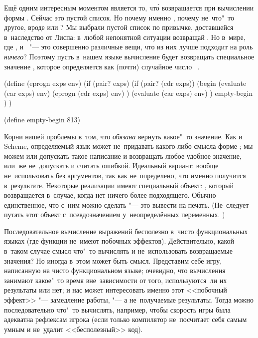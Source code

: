 Ещё одним интересным моментом является то, чт\'{о} возвращается при вычислении
формы . Сейчас это пустой список. Но почему именно \ic{()}, почему
не~что"~то другое, вроде  или \ic{(\nya)}? Мы выбрали пустой список по
привычке, доставшейся в~наследство от Лиспа: в~любой непонятной ситуации
возвращай . Но в~мире, где ,  и~\ic{()} "--- это
совершенно различные вещи, что из них лучше подходит на роль \emph{ничего}?
Поэтому пусть в~нашем языке вычисление  будет возвращать специальное
значение , которое определяется как (почти) случайное число
~\cite{leb05}.

\begin{code:lisp}
(define (eprogn exps env)
  (if (pair? exps)
      (if (pair? (cdr exps))
          (begin (evaluate (car exps) env)
                 (eprogn (cdr exps) env) )
          (evaluate (car exps) env) )
      empty-begin ) )

(define empty-begin 813)
\end{code:lisp}

Корни нашей проблемы в~том, что  \emph{обязана} вернуть какое"~то
значение. Как и Scheme, определяемый язык может не~придавать какого-либо смысла
форме ; мы можем или допускать такое написание и возвращать любое
удобное значение, или~же не~допускать и считать ошибкой. Идеальный вариант:
вообще не~использовать  без аргументов, так как не~определено, что
именно получится в~результате. Некоторые реализации имеют специальный объект:
, который возвращается в~случае, когда нет ничего более
подходящего. Обычно единственное, что с~ним можно сделать "--- это вывести на
печать. (Не~следует путать этот объект с~псевдозначением у~неопределённых
переменных. )

\bigskip

Последовательное вычисление выражений бесполезно в~чисто функциональных языках
(где функции не~имеют побочных эффектов). Действительно, какой в~таком случае
смысл что"~то вычислять и не~использовать возвращаемые значения? Но иногда
в~этом может быть смысл. Представим себе игру, написанную на чисто
функциональном языке; очевидно, что вычисления занимают какое"~то время
вне~зависимости от того, используются~ли их результаты или нет; и нас может
интересовать именно этот <<побочный эффект>> "--- замедление работы, "--- а
не~получаемые результаты. Тогда можно последовательно что"~то вычислять,
например, чтобы скорость игры была адекватна рефлексам игрока (если только
компилятор не~посчитает себя самым умным и не~удалит <<бесполезный>> код).

